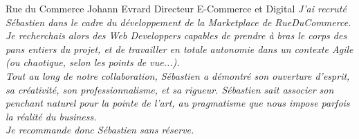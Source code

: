 \documentclass[]{friggeri-cv}
\begin{document}
\begin{entrylist}
  \entry
    {Rue du Commerce}
    {Johann Evrard}
    {Directeur E-Commerce et Digital}
    {\emph{J'ai recruté Sébastien dans le cadre du développement de la Marketplace de RueDuCommerce. Je recherchais alors des Web Developpers capables de prendre à bras le corps des pans entiers du projet, et de travailler en totale autonomie dans un contexte Agile (ou chaotique, selon les points de vue...).
    \\Tout au long de notre collaboration, Sébastien a démontré son ouverture d'esprit, sa créativité, son professionnalisme, et sa rigueur. Sébastien sait associer son penchant naturel pour la pointe de l'art, au pragmatisme que nous impose parfois la réalité du business.
    \\Je recommande donc Sébastien sans réserve.}}
\end{entrylist}
\end{document}
